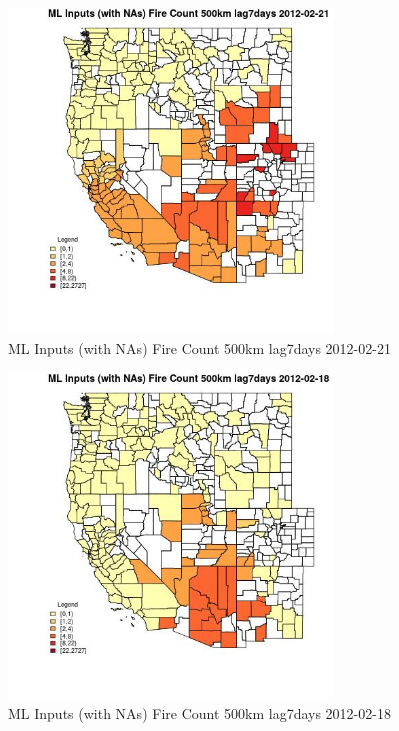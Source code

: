 \begin{figure} 
\centering  
\includegraphics[width=0.77\textwidth]{Code_Outputs/Report_ML_input_PM25_Step4_part_f_de_duplicated_aveswNAs_CountyFire_Count_500km_lag7daysMean2012-02-21.jpg} 
\caption{\label{fig:Report_ML_input_PM25_Step4_part_f_de_duplicated_aveswNAsCountyFire_Count_500km_lag7daysMean2012-02-21}ML Inputs (with NAs) Fire Count 500km lag7days 2012-02-21} 
\end{figure} 
 

\begin{figure} 
\centering  
\includegraphics[width=0.77\textwidth]{Code_Outputs/Report_ML_input_PM25_Step4_part_f_de_duplicated_aveswNAs_CountyFire_Count_500km_lag7daysMean2012-02-18.jpg} 
\caption{\label{fig:Report_ML_input_PM25_Step4_part_f_de_duplicated_aveswNAsCountyFire_Count_500km_lag7daysMean2012-02-18}ML Inputs (with NAs) Fire Count 500km lag7days 2012-02-18} 
\end{figure} 
 

